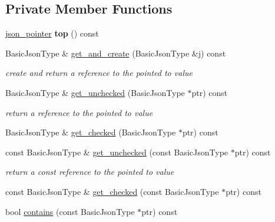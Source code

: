 \subsection*{Private Member Functions}
\begin{DoxyCompactItemize}
\item 
\mbox{\label{classnlohmann_1_1json__pointer_a00eff109d9a0091e42ada9b16b90c8d9}} 
\mbox{\hyperlink{classnlohmann_1_1json__pointer}{json\+\_\+pointer}} {\bfseries top} () const
\item 
Basic\+Json\+Type \& \mbox{\hyperlink{classnlohmann_1_1json__pointer_a583c726016f440ffe65553935c101ff5}{get\+\_\+and\+\_\+create}} (Basic\+Json\+Type \&j) const
\begin{DoxyCompactList}\small\item\em create and return a reference to the pointed to value \end{DoxyCompactList}\item 
Basic\+Json\+Type \& \mbox{\hyperlink{classnlohmann_1_1json__pointer_a577512ee6b7f030e8872b4d29fa5c3e5}{get\+\_\+unchecked}} (Basic\+Json\+Type $\ast$ptr) const
\begin{DoxyCompactList}\small\item\em return a reference to the pointed to value \end{DoxyCompactList}\item 
Basic\+Json\+Type \& \mbox{\hyperlink{classnlohmann_1_1json__pointer_a366d68a67e40d86676d3bdb52e167294}{get\+\_\+checked}} (Basic\+Json\+Type $\ast$ptr) const
\item 
const Basic\+Json\+Type \& \mbox{\hyperlink{classnlohmann_1_1json__pointer_ad6a01f8e1556eef68e5a49b33fef1548}{get\+\_\+unchecked}} (const Basic\+Json\+Type $\ast$ptr) const
\begin{DoxyCompactList}\small\item\em return a const reference to the pointed to value \end{DoxyCompactList}\item 
const Basic\+Json\+Type \& \mbox{\hyperlink{classnlohmann_1_1json__pointer_a55a5bbbc3007e479607304a3e8cb9bf5}{get\+\_\+checked}} (const Basic\+Json\+Type $\ast$ptr) const
\item 
bool \mbox{\hyperlink{classnlohmann_1_1json__pointer_a90d38e45e2d3add52d824bc55da8f772}{contains}} (const Basic\+Json\+Type $\ast$ptr) const
\end{DoxyCompactItemize}
